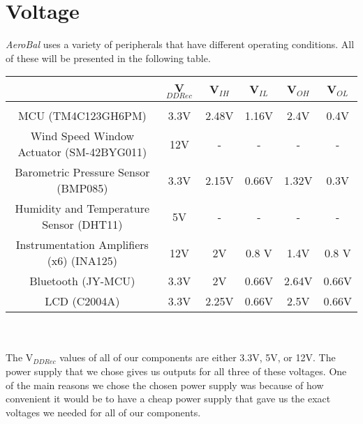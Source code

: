 \documentclass[11pt]{article}
\begin{document}
\section{Voltage}

\textit{AeroBal} uses a variety of peripherals that have different operating conditions. All of these will be presented in the following table. \\





\begin{tabular}{|c|c|c|c|c|c|}
\hline
 & V$_{DD Rec}$ & V$_{IH}$ & V$_{IL}$ & V$_{OH}$ & V$_{OL}$ \\
\hline
& & & & &  \\
MCU (TM4C123GH6PM) & 3.3V & 2.48V & 1.16V & 2.4V & 0.4V \\
Wind Speed Window Actuator (SM-42BYG011) & 12V & - & - & - & - \\
Barometric Pressure Sensor (BMP085) & 3.3V & 2.15V & 0.66V & 1.32V & 0.3V \\
Humidity and Temperature Sensor (DHT11)& 5V & - & - & - & - \\
Instrumentation Amplifiers (x6) (INA125) & 12V & 2V & 0.8 V & 1.4V & 0.8 V\\
Bluetooth (JY-MCU) & 3.3V & 2V & 0.66V  & 2.64V & 0.66V \\
LCD (C2004A) & 3.3V & 2.25V & 0.66V & 2.5V & 0.66V \\

\hline
\end{tabular} \\ \\

The V$_{DD Rec}$ values of all of our components are either 3.3V, 5V, or 12V. The power supply that we chose gives us outputs for all three of these voltages. One of the main reasons we chose the chosen power supply was because of how convenient it would be to have a cheap power supply that gave us the exact voltages we needed for all of our components. \\
\end{document}
